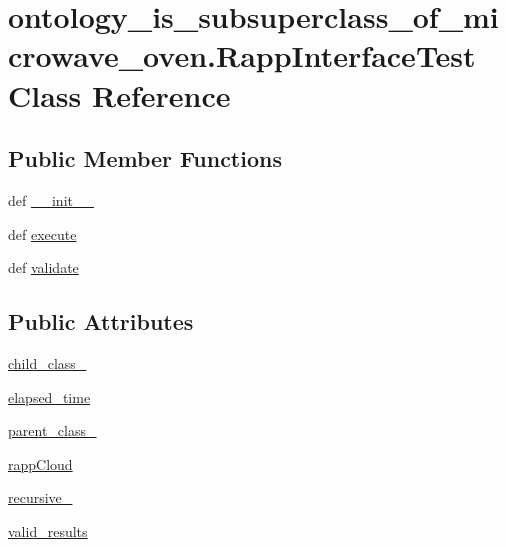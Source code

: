 \hypertarget{classontology__is__subsuperclass__of__microwave__oven_1_1RappInterfaceTest}{\section{ontology\-\_\-is\-\_\-subsuperclass\-\_\-of\-\_\-microwave\-\_\-oven.\-Rapp\-Interface\-Test Class Reference}
\label{classontology__is__subsuperclass__of__microwave__oven_1_1RappInterfaceTest}
}
\subsection*{Public Member Functions}
\begin{DoxyCompactItemize}
\item 
def \hyperlink{classontology__is__subsuperclass__of__microwave__oven_1_1RappInterfaceTest_a74fba630868366a73e1928d8108249dd}{\-\_\-\-\_\-init\-\_\-\-\_\-}
\item 
def \hyperlink{classontology__is__subsuperclass__of__microwave__oven_1_1RappInterfaceTest_a3e54400dc1ae4ed797c5b050eec7213e}{execute}
\item 
def \hyperlink{classontology__is__subsuperclass__of__microwave__oven_1_1RappInterfaceTest_a6524408df134a5241da1d2cf4419b897}{validate}
\end{DoxyCompactItemize}
\subsection*{Public Attributes}
\begin{DoxyCompactItemize}
\item 
\hyperlink{classontology__is__subsuperclass__of__microwave__oven_1_1RappInterfaceTest_a2bc12465efcbb1005a5533eb932b3f1f}{child\-\_\-class\-\_\-}
\item 
\hyperlink{classontology__is__subsuperclass__of__microwave__oven_1_1RappInterfaceTest_af238371b63ed196190b8784f12915c97}{elapsed\-\_\-time}
\item 
\hyperlink{classontology__is__subsuperclass__of__microwave__oven_1_1RappInterfaceTest_a8b1c7e0c904292b4c01a13d4ccdfb66d}{parent\-\_\-class\-\_\-}
\item 
\hyperlink{classontology__is__subsuperclass__of__microwave__oven_1_1RappInterfaceTest_a5e306b1833a055b0523bc96984d4fc8b}{rapp\-Cloud}
\item 
\hyperlink{classontology__is__subsuperclass__of__microwave__oven_1_1RappInterfaceTest_ae7e9f8875bf35c0d2bc1cf77f71a3291}{recursive\-\_\-}
\item 
\hyperlink{classontology__is__subsuperclass__of__microwave__oven_1_1RappInterfaceTest_a7ab8b4674e5c00e5697e9c8408397062}{valid\-\_\-results}
\end{DoxyCompactItemize}


